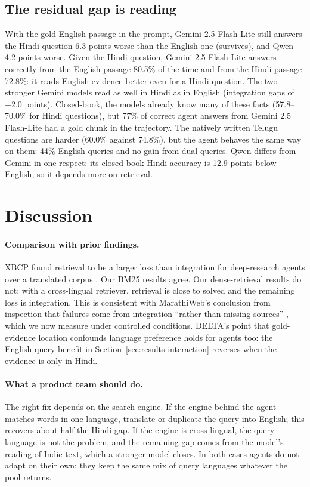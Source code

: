 \subsection{The residual gap is reading}
\label{sec:results-retriever}
With the gold English passage in the prompt, Gemini 2.5 Flash-Lite still answers the Hindi question 6.3 points worse than the English one (survives), and Qwen 4.2 points worse. Given the Hindi question, Gemini 2.5 Flash-Lite answers correctly from the English passage 80.5\% of the time and from the Hindi passage 72.8\%: it reads English evidence better even for a Hindi question. The two stronger Gemini models read as well in Hindi as in English (integration gaps of $-2.0$ points). Closed-book, the models already know many of these facts (57.8--70.0\% for Hindi questions), but 77\% of correct agent answers from Gemini 2.5 Flash-Lite had a gold chunk in the trajectory. The natively written Telugu questions are harder (60.0\% against 74.8\%), but the agent behaves the same way on them: 44\% English queries and no gain from dual queries. Qwen differs from Gemini in one respect: its closed-book Hindi accuracy is 12.9 points below English, so it depends more on retrieval.

\section{Discussion}
\label{sec:discussion}

\paragraph{Comparison with prior findings.} XBCP found retrieval to be a larger loss than integration for deep-research agents over a translated corpus \citep{a2606_15345}. Our BM25 results agree. Our dense-retrieval results do not: with a cross-lingual retriever, retrieval is close to solved and the remaining loss is integration. This is consistent with MarathiWeb's conclusion from inspection that failures come from integration ``rather than missing sources'' \citep{kale2026marathiweb}, which we now measure under controlled conditions. DELTA's point that gold-evidence location confounds language preference \citep{a2601_02956} holds for agents too: the English-query benefit in Section~\ref{sec:results-interaction} reverses when the evidence is only in Hindi.

\paragraph{What a product team should do.} The right fix depends on the search engine. If the engine behind the agent matches words in one language, translate or duplicate the query into English; this recovers about half the Hindi gap. If the engine is cross-lingual, the query language is not the problem, and the remaining gap comes from the model's reading of Indic text, which a stronger model closes. In both cases agents do not adapt on their own: they keep the same mix of query languages whatever the pool returns.

